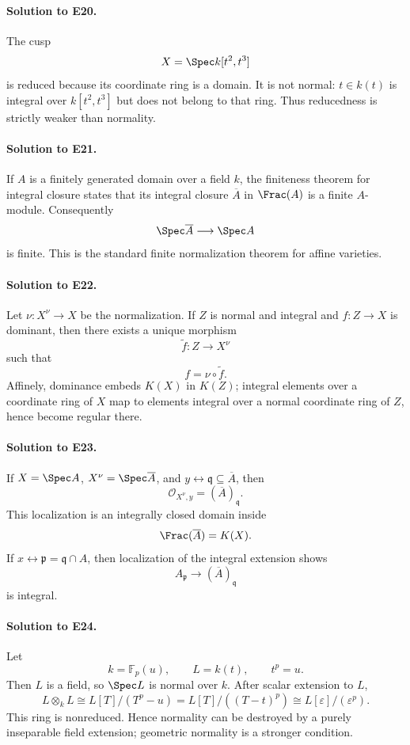 \paragraph{Solution to E20.}
The cusp
\[
X=\Spec k[t^2,t^3]
\]
is reduced because its coordinate ring is a domain.  It is not normal: \(t\in k(t)\) is integral
over \(k[t^2,t^3]\) but does not belong to that ring.  Thus reducedness is strictly weaker than
normality.

\paragraph{Solution to E21.}
If \(A\) is a finitely generated domain over a field \(k\), the finiteness theorem for integral
closure states that its integral closure \(\overline A\) in \(\Frac(A)\) is a finite \(A\)-module.
Consequently
\[
\Spec\overline A\longrightarrow\Spec A
\]
is finite.  This is the standard finite normalization theorem for affine varieties.

\paragraph{Solution to E22.}
Let \(\nu:X^\nu\to X\) be the normalization.  If \(Z\) is normal and integral and
\(f:Z\to X\) is dominant, then there exists a unique morphism
\[
\widetilde f:Z\to X^\nu
\]
such that
\[
f=\nu\circ\widetilde f.
\]
Affinely, dominance embeds \(K(X)\) in \(K(Z)\); integral elements over a coordinate ring of \(X\)
map to elements integral over a normal coordinate ring of \(Z\), hence become regular there.

\paragraph{Solution to E23.}
If \(X=\Spec A\), \(X^\nu=\Spec\overline A\), and
\(y\leftrightarrow\mathfrak q\subseteq\overline A\), then
\[
\mathcal O_{X^\nu,y}=(\overline A)_{\mathfrak q}.
\]
This localization is an integrally closed domain inside
\[
\Frac(\overline A)=K(X).
\]
If \(x\leftrightarrow\mathfrak p=\mathfrak q\cap A\), then localization of the integral extension
shows
\[
A_{\mathfrak p}\longrightarrow(\overline A)_{\mathfrak q}
\]
is integral.

\paragraph{Solution to E24.}
Let
\[
k=\mathbb F_p(u),\qquad L=k(t),\qquad t^p=u.
\]
Then \(L\) is a field, so \(\Spec L\) is normal over \(k\).  After scalar extension to \(L\),
\[
L\otimes_kL
\cong
L[T]/(T^p-u)
=
L[T]/((T-t)^p)
\cong
L[\varepsilon]/(\varepsilon^p).
\]
This ring is nonreduced.  Hence normality can be destroyed by a purely inseparable field extension;
geometric normality is a stronger condition.

